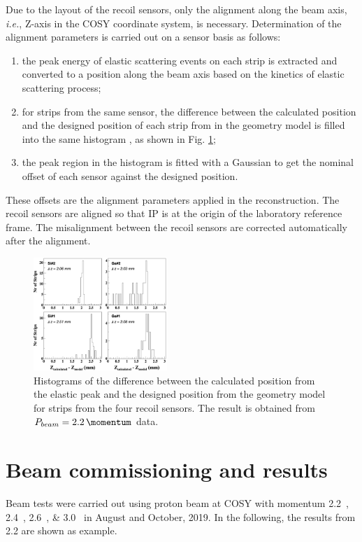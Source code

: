 \documentclass[number,5p]{elsarticle}
\begin{document}
Due to the layout of the recoil sensors, only the alignment along
the beam axis, \textit{i.e.}, Z-axis in the COSY coordinate system, is necessary.
Determination of the alignment parameters is carried out on a sensor basis as follows:
\begin{enumerate}
\item the peak energy of elastic scattering events on each strip is extracted and
  converted to a position along the beam axis based on the kinetics of elastic scattering process;
\item for strips from the same sensor, the difference between the calculated
  position and the designed position of each strip from in the geometry model is filled into the same histogram , as shown in Fig. \ref{fig:alignment};
\item the peak region in the histogram is fitted with a Gaussian to get the
  nominal offset of each sensor against the designed position.
\end{enumerate}
These offsets are the alignment parameters applied in the reconstruction.
The recoil sensors are aligned so that IP is at the origin of the laboratory reference frame.
The misalignment between the recoil sensors are corrected automatically after the alignment.
\begin{figure}[h!]
  \centering
  \includegraphics[width=0.45\textwidth]{./alignment.png}
  \caption{Histograms of the difference between the calculated position from the
    elastic peak and the designed position from the geometry model for strips
    from the four recoil sensors. The result is obtained from $P_{beam} =
    \SI{2.2}{\momentum}$ data.}
  \label{fig:alignment}
\end{figure}

\section{Beam commissioning and results}
\label{sec:result}

Beam tests were carried out using proton beam at COSY with momentum
\SIlist[list-units=single]{2.2;2.4;2.6;3.0}{\momentum} in August and October, 2019.
In the following, the results from \SI{2.2}{\momentum} are shown as example.
\end{document}

